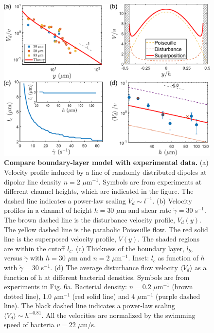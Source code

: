 \begin{figure}[!ht]
	\begin{center}
	\includegraphics[width=5.5 in]{Figs/3-Rheo/7b.pdf}
	\end{center}
	\caption[Compare boundary-layer model with experimental data]
	{
	\textbf{Compare boundary-layer model with experimental data.}
  (a) Velocity profile induced by a line of randomly distributed dipoles at dipolar line density $n = 2$ $\mu$m$^{-1}$. Symbols are from experiments at different channel heights, which are indicated in the figure. The dashed line indicates a power-law scaling $V_d \sim l^{-1}$.
  (b) Velocity profiles in a channel of height $h = 30$ $\mu$m and shear rate $\dot\gamma=30$ s$^{-1}$. The brown dashed line is the disturbance velocity profile, $V_d(y)$. The yellow dashed line is the parabolic Poiseuille flow. The red solid line is the superposed velocity profile, $V(y)$. The shaded regions are within the cutoff $l_c$.
  (c) Thickness of the boundary layer, $l_b$, versus $\dot\gamma$ with $h = 30$ $\mu$m and $n = 2$ $\mu$m$^{-1}$. Inset: $l_c$ as function of $h$ with $\dot\gamma = 30$ s$^{-1}$.
  (d) The average disturbance flow velocity $\langle V_d \rangle$ as a function of h at different bacterial densities. Symbols are from experiments in Fig. 6a. Bacterial density: $n = 0.2$ $\mu$m$^{-1}$ (brown dotted line), 1.0 $\mu$m$^{-1}$ (red solid line) and 4 $\mu$m$^{-1}$ (purple dashed line). The black dashed line indicates a power-law scaling $\langle V_d \rangle \sim h^{-0.81}$. All the velocities are normalized by the swimming speed of bacteria $v = 22$ $\mu$m/s.
  }
  \label{fig:3-model-compare}
\end{figure}


